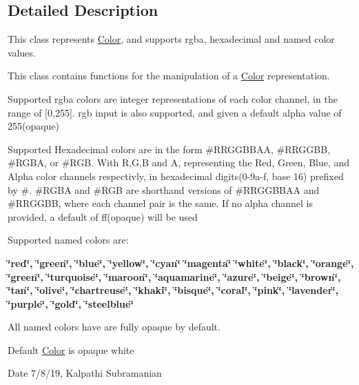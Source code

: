 \subsection{Detailed Description}
This class represents \mbox{\hyperlink{classbridges_1_1_color}{Color}}, and supports rgba, hexadecimal and named color values. 

This class contains functions for the manipulation of a \mbox{\hyperlink{classbridges_1_1_color}{Color}} representation.

Supported rgba colors are integer representations of each color channel, in the range of \mbox{[}0,255\mbox{]}. rgb input is also supported, and given a default alpha value of 255(opaque)

Supported Hexadecimal colors are in the form \#\+R\+R\+G\+G\+B\+B\+AA, \#\+R\+R\+G\+G\+BB, \#\+R\+G\+BA, or \#\+R\+GB. With R,G,B and A, representing the Red, Green, Blue, and Alpha color channels respectivly, in hexadecimal digits(0-\/9a-\/f, base 16) prefixed by \textquotesingle{}\#\textquotesingle{}. \#\+R\+G\+BA and \#\+R\+GB are shorthand versions of \#\+R\+R\+G\+G\+B\+B\+AA and \#\+R\+R\+G\+G\+BB, where each channel pair is the same. If no alpha channel is provided, a default of \textquotesingle{}ff\textquotesingle{}(opaque) will be used

Supported named colors are\+:

{\bfseries{\char`\"{}red\char`\"{}, \char`\"{}green\char`\"{}, \char`\"{}blue\char`\"{}, \char`\"{}yellow\char`\"{}, \char`\"{}cyan\char`\"{} \char`\"{}magenta\char`\"{} \char`\"{}white\char`\"{}, \char`\"{}black\char`\"{}, \char`\"{}orange\char`\"{}, \char`\"{}green\char`\"{}, \char`\"{}turquoise\char`\"{}, \char`\"{}maroon\char`\"{}, \char`\"{}aquamarine\char`\"{}, \char`\"{}azure\char`\"{}, \char`\"{}beige\char`\"{}, \char`\"{}brown\char`\"{}, \char`\"{}tan\char`\"{}, \char`\"{}olive\char`\"{}, \char`\"{}chartreuse\char`\"{}, \char`\"{}khaki\char`\"{}, \char`\"{}bisque\char`\"{}, \char`\"{}coral\char`\"{}, \char`\"{}pink\char`\"{}, \char`\"{}lavender\char`\"{}, \char`\"{}purple\char`\"{}, \char`\"{}gold\char`\"{}, \char`\"{}steelblue\char`\"{} }}

All named colors have are fully opaque by default.

Default \mbox{\hyperlink{classbridges_1_1_color}{Color}} is opaque white

\begin{DoxyDate}{Date}
7/8/19, Kalpathi Subramanian 
\end{DoxyDate}


